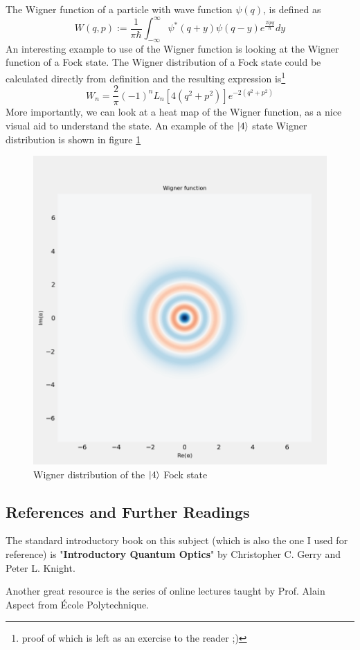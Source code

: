 The Wigner function of a particle with wave function $\psi (q)$, is defined as 
\[
    W (q, p) := \frac{1}{\pi \hbar} \int_{-\infty}^\infty \psi^* (q + y) \psi (q - y) e^{\frac{2ipy}{\hbar}} dy
\]
An interesting example to use of the Wigner function is looking at the Wigner function of a Fock state. The Wigner distribution of a Fock state could be calculated directly from definition and the resulting expression is\footnote{proof of which is left as an exercise to the reader ;)}
\[
    W_n = \frac{2}{\pi} (-1)^n L_n[4 (q^2 + p^2)]e^{-2 (q^2 + p^2)}
\]
More importantly, we can look at a heat map of the Wigner function, as a nice visual aid to understand the state. An example of the $\ket{4}$ state Wigner distribution is shown in figure \ref{fig:Fock-State-Wigner}
\begin{figure}[H]
    \centering
    \includegraphics[width=0.3\columnwidth]{Wigner.png}
    \caption{Wigner distribution of the $\ket{4}$ Fock state}
    \label{fig:Fock-State-Wigner}
\end{figure}

\subsection{References and Further Readings}
The standard introductory book on this subject (which is also the one I used for reference) is "\textbf{Introductory Quantum Optics}" by Christopher C. Gerry and Peter L. Knight.

Another great resource is the series of online lectures taught by Prof. Alain Aspect from École Polytechnique.